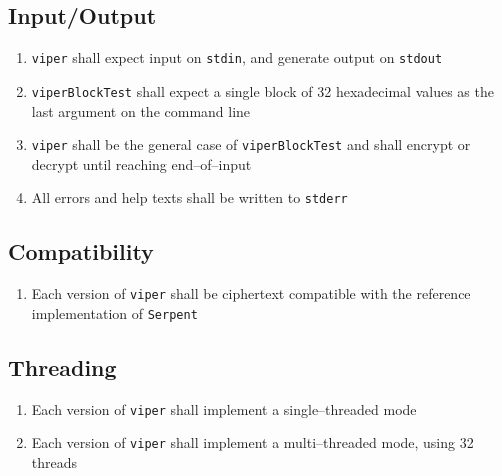 \subsection{Input/Output}
\begin{enumerate}
\item \texttt{viper} shall expect input on \texttt{stdin}, and generate output on \texttt{stdout}
\item \texttt{viperBlockTest} shall expect a single block of 32 hexadecimal values as the last argument on the command line
\item \texttt{viper} shall be the general case of \texttt{viperBlockTest} and shall encrypt or decrypt until reaching end--of--input
\item All errors and help texts shall be written to \texttt{stderr}
\end{enumerate}

\subsection{Compatibility}
\begin{enumerate}
\item Each version of \texttt{viper} shall be ciphertext compatible with the reference implementation of \texttt{Serpent} \cite{submission-files, referenceImplementation}
\end{enumerate}

\subsection{Threading}
\label{threading}
\begin{enumerate}
\item Each version of \texttt{viper} shall implement a single--threaded mode
\item Each version of \texttt{viper} shall implement a multi--threaded mode, using 32 threads
\end{enumerate}
